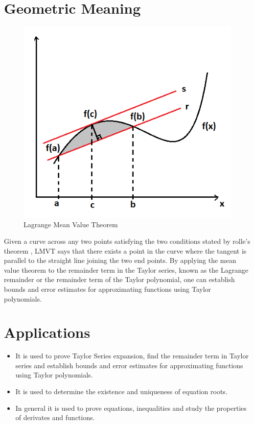 \documentclass[12pt]{article}
\begin{document}
\section*{Geometric Meaning}
\begin{figure}[H]
     \centering
     \includegraphics[scale=0.5]{LMT.png}
     \caption{Lagrange Mean Value Theorem}
\end{figure}     
Given a curve across any two points satisfying the two conditions stated by rolle's theorem , LMVT says that there exists a point in the curve where the tangent is parallel to the straight line joining the two end points. By applying the mean value theorem to the remainder term in the Taylor series, known as the Lagrange remainder or the remainder term of the Taylor polynomial, one can establish bounds and error estimates for approximating functions using Taylor polynomials.
\section*{Applications}
\begin{itemize}
    \item It is used to prove Taylor Series expansion, find the remainder term in Taylor series and establish bounds and error estimates for approximating functions using Taylor polynomials.
    \item It is used to determine the existence and uniqueness of equation roots. ~\cite{Jiang_2020}
    \item In general it is used to prove equations, inequalities and study the properties of derivates and functions. ~\cite{Jiang_2020}
\end{itemize}
\end{document}
